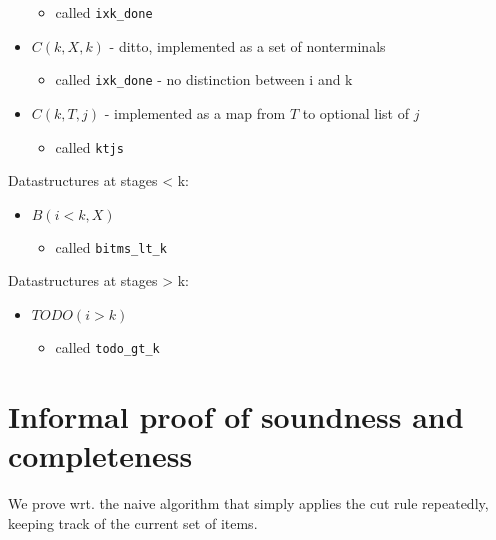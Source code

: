 \documentclass[]{article}
\begin{document}
\begin{multicols}{2}
\begin{itemize}
  \begin{itemize}
  \itemsep1pt\parskip0pt
  \item
    called \texttt{ixk\_done}
  \end{itemize}
\item
  \(C(k,X,k)\) - ditto, implemented as a set of nonterminals

  \begin{itemize}
  \itemsep1pt\parskip0pt
  \item
    called \texttt{ixk\_done} - no distinction between i and k
  \end{itemize}
\item
  \(C(k,T,j)\) - implemented as a map from \(T\) to optional list of
  \(j\)

  \begin{itemize}
  \itemsep1pt\parskip0pt
  \item
    called \texttt{ktjs}
  \end{itemize}
\end{itemize}

Datastructures at stages \textless{} k:

\begin{itemize}
\itemsep1pt\parskip0pt
\item
  \(B(i<k,X)\)

  \begin{itemize}
  \itemsep1pt\parskip0pt
  \item
    called \texttt{bitms\_lt\_k}
  \end{itemize}
\end{itemize}

Datastructures at stages \textgreater{} k:

\begin{itemize}
\itemsep1pt\parskip0pt
\item
  \(TODO(i>k)\)

  \begin{itemize}
  \itemsep1pt\parskip0pt
  \item
    called \texttt{todo\_gt\_k}
  \end{itemize}
\end{itemize}

\section{Informal proof of soundness and completeness}

We prove wrt. the naive algorithm that simply applies the cut rule
repeatedly, keeping track of the current set of items.


\end{multicols}
\end{document}
